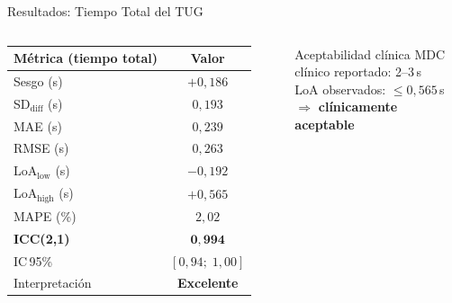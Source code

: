 \documentclass[10pt,aspectratio=169]{beamer}
\begin{document}
\begin{frame}{Resultados: Tiempo Total del TUG}
  \begin{columns}[c]
      \centering
      \small
      \begin{tabular}{lc}
        \toprule
        \textbf{Métrica (tiempo total)} & \textbf{Valor}\\
        \midrule
        Sesgo (s)             & $+0{,}186$\\
        SD$_\text{diff}$ (s)  & $0{,}193$\\
        MAE (s)               & $0{,}239$\\
        RMSE (s)              & $0{,}263$\\
        LoA$_\text{low}$ (s)  & $-0{,}192$\\
        LoA$_\text{high}$ (s) & $+0{,}565$\\
        MAPE (\%)             & $2{,}02$\\
        \midrule
        \textbf{ICC(2,1)}     & $\mathbf{0{,}994}$\\
        IC\,95\%              & $[0{,}94;\;1{,}00]$\\
        Interpretación        & \textcolor{green!55!black}{\textbf{Excelente}}\\
        \bottomrule
      \end{tabular}
      \vspace{0.4em}

      \begin{alertblock}{\small Aceptabilidad clínica}
        \small MDC clínico reportado: 2--3\,s\\
        LoA observados: $\leq 0{,}565$\,s\\
        $\Rightarrow$ \textbf{clínicamente aceptable}
      \end{alertblock}
      \centering
  \end{columns}
\end{frame}
\end{document}

